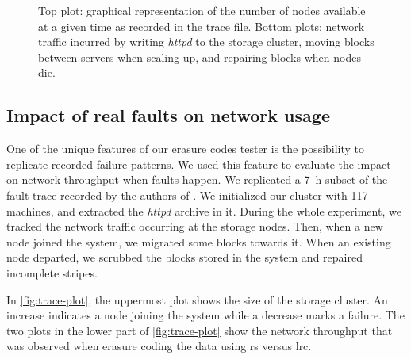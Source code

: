 \begin{figure}
    \centering
    
    \caption{Top plot: graphical representation of the number of nodes available at a given time as recorded in the trace file. Bottom plots: network traffic incurred by writing \textit{httpd} to the storage cluster, moving blocks between servers when scaling up, and repairing blocks when nodes die.}
    \label{fig:trace-plot}
\end{figure}

\subsection{Impact of real faults on network usage}
\label{subsec:fault-trace}

One of the unique features of our erasure codes tester is the possibility to replicate recorded failure patterns.
We used this feature to evaluate the impact on network throughput when faults happen.
We replicated a \SI{7}{\hour} subset of the fault trace recorded by the authors of \autocite{websites02}.
We initialized our cluster with 117 machines, and extracted the \textit{httpd} archive in it.
During the whole experiment, we tracked the network traffic occurring at the storage nodes.
Then, when a new node joined the system, we migrated some blocks towards it.
When an existing node departed, we scrubbed the blocks stored in the system and repaired incomplete stripes.

In \autoref{fig:trace-plot}, the uppermost plot shows the size of the storage cluster.
An increase indicates a node joining the system while a decrease marks a failure.
The two plots in the lower part of \autoref{fig:trace-plot} show the network throughput that was observed when erasure coding the data using \ac{rs} versus \ac{lrc}.

